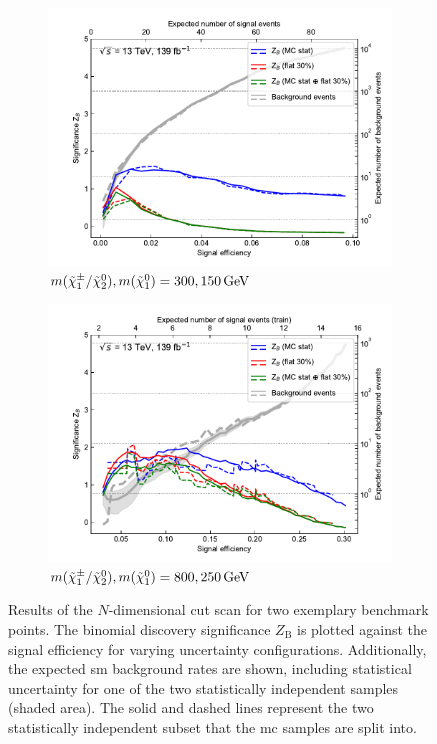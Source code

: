 \begin{figure}
	\centering
	\begin{subfigure}[b]{0.5\linewidth}
		\centering\includegraphics[width=1.0\textwidth]{N-1_cut_scan/z_vs_effs_300_150.pdf}
		\caption{$m(\charg/\neutr), m(\lsp) =  300, \SI{150}{\GeV}$}
	\end{subfigure}\hfill
	\begin{subfigure}[b]{0.5\linewidth}
		\centering\includegraphics[width=1.0\textwidth]{N-1_cut_scan/z_vs_effs_800_250.pdf}
		\caption{$m(\charg/\neutr), m(\lsp) =  800, \SI{250}{\GeV}$}
	\end{subfigure}\hfill

	\caption[N-dimensional cut scan results]{Results of the $N$-dimensional cut scan for two exemplary benchmark points. The binomial discovery significance $Z_\mathrm{B}$ is plotted against the signal efficiency for varying uncertainty configurations. Additionally, the expected \gls{sm} background rates are shown, including statistical uncertainty for one of the two statistically independent samples (shaded area). The solid and dashed lines represent the two statistically independent subset that the \gls{mc} samples are split into.}
	\label{fig:results_z_vs_eff}
\end{figure}

